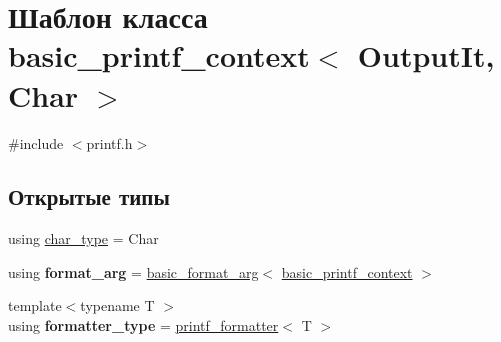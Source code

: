 \hypertarget{classbasic__printf__context}{}\section{Шаблон класса basic\+\_\+printf\+\_\+context$<$ Output\+It, Char $>$}
\label{classbasic__printf__context}


{\ttfamily \#include $<$printf.\+h$>$}

\subsection*{Открытые типы}
\begin{DoxyCompactItemize}
\item 
using \hyperlink{classbasic__printf__context_a5ceea5767a393451e5a82b2b75a6f63e}{char\+\_\+type} = Char
\item 
\mbox{\label{classbasic__printf__context_a3c272a010394b94844440423d86b176f}} 
using {\bfseries format\+\_\+arg} = \hyperlink{classbasic__format__arg}{basic\+\_\+format\+\_\+arg}$<$ \hyperlink{classbasic__printf__context}{basic\+\_\+printf\+\_\+context} $>$
\item 
\mbox{\label{classbasic__printf__context_a3c239f1d7f73104a75165b2c415d7009}} 
{\footnotesize template$<$typename T $>$ }\\using {\bfseries formatter\+\_\+type} = \hyperlink{structprintf__formatter}{printf\+\_\+formatter}$<$ T $>$
\end{DoxyCompactItemize}
